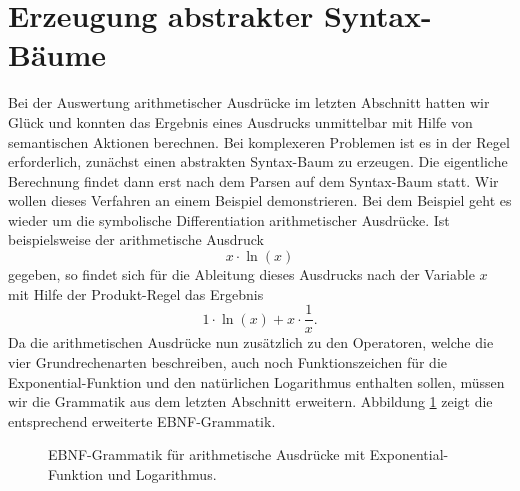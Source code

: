 \section{Erzeugung abstrakter Syntax-B\"aume}
Bei der Auswertung arithmetischer Ausdr\"ucke im letzten Abschnitt hatten wir Gl\"uck
und konnten das Ergebnis eines Ausdrucks unmittelbar mit Hilfe von semantischen Aktionen
berechnen.  Bei komplexeren Problemen ist es in der Regel erforderlich, zun\"achst einen
abstrakten Syntax-Baum zu erzeugen.  Die eigentliche Berechnung findet dann erst nach dem
Parsen auf dem Syntax-Baum statt.  Wir wollen dieses Verfahren an einem Beispiel
demonstrieren.  Bei dem Beispiel geht es wieder um die symbolische Differentiation
arithmetischer Ausdr\"ucke.  Ist beispielsweise der arithmetische Ausdruck 
\[ x \cdot \ln(x) \]
gegeben, so findet sich f\"ur die Ableitung dieses Ausdrucks nach der Variable $x$ mit Hilfe
der Produkt-Regel das
Ergebnis 
\[ 1 \cdot \ln(x) + x \cdot \frac{1}{x}. \]  
Da die arithmetischen Ausdr\"ucke nun
zus\"atzlich zu den Operatoren, welche die vier Grundrechenarten beschreiben, auch noch 
Funktionszeichen f\"ur die Exponential-Funktion und den nat\"urlichen Logarithmus enthalten
sollen, m\"ussen wir die Grammatik aus dem letzten Abschnitt erweitern.
Abbildung \ref{fig:Expr-exp-ln} zeigt die entsprechend erweiterte EBNF-Grammatik.

\begin{figure}[htbp]
  \begin{center}    
  \end{center}
  \caption{EBNF-Grammatik f\"ur arithmetische Ausdr\"ucke mit Exponential-Funktion und Logarithmus.}
  \label{fig:Expr-exp-ln}
\end{figure}

